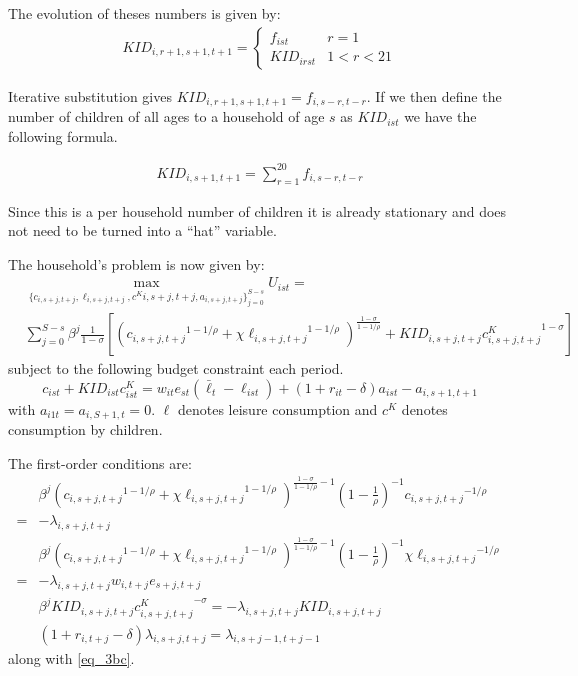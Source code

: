 \documentclass[letterpaper,12pt]{article}
\theoremstyle{definition}
\numberwithin{equation}{section}
\begin{document}
\begin{spacing}{1.5}
	The evolution of theses numbers is given by:
	\begin{align}
		KID_{i,r+1,s+1,t+1} = \left\{ \begin{matrix} f_{ist} & r=1 \\
		KID_{irst} & 1<r<21\end{matrix} \right. \nonumber
	\end{align}

	Iterative substitution gives $KID_{i,r+1,s+1,t+1} = f_{i,s-r,t-r}$.  If we then define the number of children of all ages to a household of age $s$ as $KID_{ist}$ we have the following formula.

	\begin{align}
		KID_{i,s+1,t+1} = \sum_{r=1}^{20} f_{i,s-r,t-r}
	\end{align}

	Since this is a per household number of children it is already stationary and does not need to be turned into a ``hat'' variable.

	The household's problem is now given by:
	\begin{equation}
		\begin{split}
		& \max_{\{c_{i,s+j,t+j},\ell_{i,s+j,t+j},c^K{i,s+j,t+j},a_{i,s+j,t+j}\}_{j=0}^{S-s}} U_{ist} = \\
		& \sum_{j=0}^{S-s} \beta^j \frac{1}{1-\sigma} \left[ \left( {c_{i,s+j,t+j}}^{1-1/\rho} + \chi {\ell_{i,s+j,t+j}}^{1-1/\rho}\right)^{\tfrac{{1-\sigma}}{1-1/\rho}} + KID_{i,s+j,t+j}{c^K_{i,s+j,t+j}}^{1-\sigma}\right] \nonumber
		\end{split}
	\end{equation}
	subject to the following budget constraint each period.
	\begin{equation} \label{eq_3bc}
		c_{ist} + KID_{ist}c^K_{ist} = w_{it} e_{st} (\bar \ell_t -\ell_{ist}) + (1+r_{it}-\delta)a_{ist} - a_{i,s+1,t+1}
	\end{equation}
	with $a_{i1t} = a_{i,S+1,t} = 0$.  $\ell$ denotes leisure consumption and $c^K$ denotes consumption by children.

	The first-order conditions are:
	\begin{align}
		& \beta^j \left( {c_{i,s+j,t+j}}^{1-1/\rho} + \chi {\ell_{i,s+j,t+j}}^{1-1/\rho}\right)^{\tfrac{{1-\sigma}}{1-1/\rho}-1} \left(1-\tfrac{1}{\rho}\right)^{-1} {c_{i,s+j,t+j}}^{-1/\rho}  \nonumber \\ = &  - \lambda_{i,s+j,t+j}  \label{eq_3foc1} \\
		& \beta^j \left( {c_{i,s+j,t+j}}^{1-1/\rho} + \chi {\ell_{i,s+j,t+j}}^{1-1/\rho}\right)^{\tfrac{{1-\sigma}}{1-1/\rho}-1} \left(1-\tfrac{1}{\rho}\right)^{-1} \chi {\ell_{i,s+j,t+j}}^{-1/\rho} \nonumber \\ = & - \lambda_{i,s+j,t+j} w_{i,t+j} e_{s+j,t+j} \label{eq_3foc2} \\
		& \beta^j KID_{i,s+j,t+j}{c^K_{i,s+j,t+j}}^{-\sigma} = - \lambda_{i,s+j,t+j} KID_{i,s+j,t+j} \label{eq_3foc3} \\
               & (1+r_{i,t+j}-\delta) \lambda_{i,s+j,t+j} = \lambda_{i,s+j-1,t+j-1} \label{eq_3foc4}
	\end{align}	
	along with \eqref{eq_3bc}.


\end{spacing}
\end{document}

